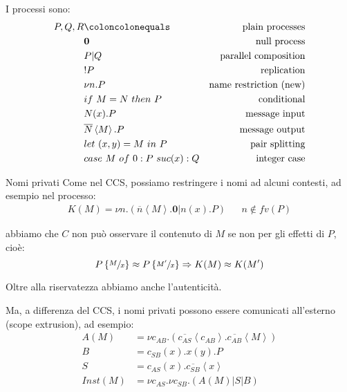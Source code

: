 \documentclass{beamer}
\theoremstyle{plain}
\theoremstyle{definition}
\theoremstyle{remark}
\newcommand{\obar}[1]{\overline{#1}}
\newcommand{\set}[1]{\left\{#1\right\}}
\newcommand{\pa}[1]{\left(#1\right)}
\newcommand{\ang}[1]{\left<#1\right>}
\begin{document}
\begin{frame}
  I processi sono:
  \begin{align*}
    P,Q,R & \coloncolonequals & \text{plain processes} \\
          & \mathbf{0} & \text{null process} \\
          & P | Q & \text{parallel composition} \\
          & !P & \text{replication} \\
          & \nu n.P & \text{name restriction (new)} \\
          & if\ M=N\ then\ P & \text{conditional} \\
          & N(x).P & \text{message input} \\
          & \obar{N}\left< M\right> .P & \text{message output} \\
          & let\ (x,y) = M\ in\ P & \text{pair splitting} \\
          & case\ M\ of\ 0: P\ suc(x): Q & \text{integer case}
  \end{align*}
\end{frame}

\begin{frame}{Nomi privati}
  Come nel CCS, possiamo restringere i nomi ad alcuni contesti, ad
  esempio nel processo:
  \begin{align*}
  K(M) = \nu n. \pa{ \obar{n}\ang{M}.\mathbf{0} | n(x).P } & &  n\not\in
    fv(P)
  \end{align*}

  abbiamo che $C$ non pu\`o osservare il contenuto di $M$ se non per gli effetti
  di $P$, cioè:
  \[ P\set{\sfrac{M}{x}} \approx P\set{\sfrac{M'}{x}} \Rightarrow K(M)
    \approx K(M') \]
  
  Oltre alla riservatezza abbiamo anche l'autenticit\`a.
\end{frame}

\begin{frame}
  Ma, a differenza del CCS, i nomi privati possono essere comunicati
  all'esterno (scope extrusion), ad esempio:
  \begin{align*}
    A(M) & = \nu
           c_{AB}. \pa{\obar{c_{AS}}\ang{c_{AB}}. \obar{c_{AB}}\ang{M}}
    \\
    B & = c_{SB}(x). x(y) .P \\
    S & = c_{AS}(x) . \obar{c_{SB}} \ang{x} \\
    Inst(M) & = \nu c_{AS}. \nu c_{SB}. \pa{ A(M) | S | B}
  \end{align*}
  \begin{center}
  \end{center}
\end{frame}
\end{document}
